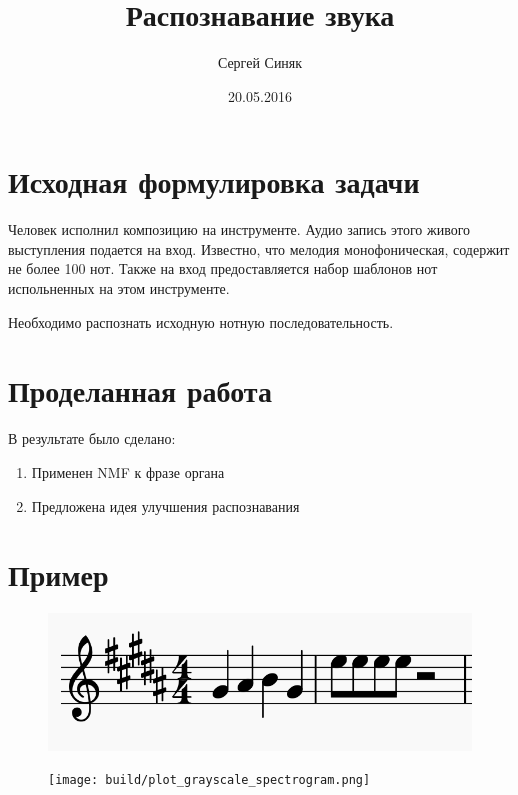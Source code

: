 \documentclass[unicode]{beamer}
\title{Распознавание звука}
\author{Сергей Синяк}
\date{20.05.2016}
\begin{document}
\begin{frame}
	\titlepage
\end{frame}

\section{Исходная формулировка задачи}
\begin{frame}
  Человек исполнил композицию на инструменте. Аудио запись этого
  живого выступления подается на вход. Известно, что мелодия
  монофоническая, содержит не более 100 нот. Также на вход
  предоставляется набор шаблонов нот испольненных на этом
  инструменте.

  Необходимо распознать исходную нотную последовательность.
\end{frame}

\section{Проделанная работа}

\begin{frame}
   В результате было сделано:
  \begin{enumerate}
    \item Применен NMF к фразе органа
    \item Предложена идея улучшения распознавания
  \end{enumerate}
\end{frame}

\section{Пример}
\begin{frame}
\begin{figure}
    \includegraphics[scale=.25]{res/organ-score.png}
\end{figure}
\end{frame}

\begin{frame}
\begin{figure}
    \texttt{[image: build/plot\_grayscale\_spectrogram.png]}
\end{figure}
\end{frame}
\end{document}
